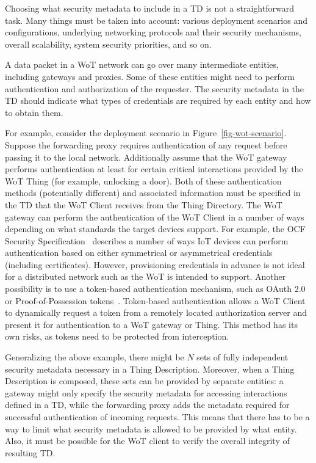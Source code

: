 Choosing what security metadata to include in a TD is not a straightforward task.
Many things must be taken into account: 
various deployment scenarios and configurations, 
underlying networking protocols and their security mechanisms, 
overall scalability, system security priorities, and so on.

A data packet in a WoT network can go over many intermediate entities,
including gateways and proxies.
Some of these entities might need to perform authentication 
and authorization of the requester. 
The security metadata in the TD should indicate
what types of credentials are required by each entity and how to obtain them.

For example, consider the deployment scenario in Figure~\ref{fig-wot-scenario}.
Suppose the forwarding proxy requires authentication of any request before passing it to the local network.
Additionally assume that the WoT gateway performs authentication 
at least for certain critical interactions provided by the WoT Thing 
(for example, unlocking a door). 
Both of these authentication methods (potentially different) and 
associated information must be specified in the TD 
that the WoT Client receives from the Thing Directory.
The WoT gateway can perform the authentication of the WoT Client 
in a number of ways depending on what standards the target devices support.
For example, the OCF Security Specification~\cite{ocf2017} 
describes a number of ways IoT devices can perform authentication based on 
either symmetrical or asymmetrical credentials (including certificates). 
However, provisioning credentials in advance 
is not ideal for a distributed network such as the WoT is intended to support.
Another possibility is to use a token-based authentication mechanism,
such as OAuth 2.0 or Proof-of-Possession tokens~\cite{ace2017}.
Token-based authentication allows  
a WoT Client to dynamically request a token from a remotely 
located authorization server and present it for 
authentication to a WoT gateway or Thing.
This method has its own risks, as tokens need to be protected
from interception.

Generalizing the above example, 
there might be $N$ sets of fully independent security metadata
necessary in a Thing Description.
Moreover, when a Thing Description is composed, 
these sets can be provided by separate entities: 
a gateway might only specify the security metadata for accessing interactions defined in a TD,
while the forwarding proxy adds the metadata required for successful authentication of incoming requests.
This means that there has to be a way to limit what security metadata 
is allowed to be provided by what entity.
Also, it must be possible for the WoT client to verify the overall integrity of resulting TD. 
 
